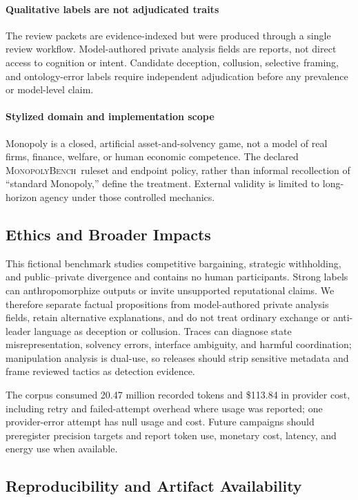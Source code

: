 \documentclass[conference]{IEEEtran}
\newcommand{\Bench}{\textsc{MonopolyBench}}
\begin{document}
\paragraph{Qualitative labels are not adjudicated traits}
The review packets are evidence-indexed but were produced through a single
review workflow. Model-authored private analysis fields are reports, not direct
access to cognition or intent. Candidate deception, collusion, selective
framing, and ontology-error labels require independent adjudication before any
prevalence or model-level claim.

\paragraph{Stylized domain and implementation scope}
Monopoly is a closed, artificial asset-and-solvency game, not a model of real
firms, finance, welfare, or human economic competence. The declared
\Bench\ ruleset and endpoint policy, rather than informal recollection of
``standard Monopoly,'' define the treatment. External validity is limited to
long-horizon agency under those controlled mechanics.

\subsection{Ethics and Broader Impacts}

This fictional benchmark studies competitive bargaining, strategic
withholding, and public--private divergence and contains no human participants.
Strong labels can anthropomorphize outputs or invite unsupported reputational
claims. We therefore separate factual propositions from model-authored private
analysis fields, retain alternative explanations, and do not treat ordinary
exchange or anti-leader language as deception or collusion. Traces can diagnose
state misrepresentation, solvency errors, interface ambiguity, and harmful
coordination; manipulation analysis is dual-use, so releases should strip
sensitive metadata and frame reviewed tactics as detection evidence.

The corpus consumed 20.47 million recorded tokens and \$113.84 in provider
cost, including retry and failed-attempt overhead where usage was reported;
one provider-error attempt has null usage and cost. Future campaigns should
preregister precision targets and report token use, monetary cost, latency,
and energy use when available.

\subsection{Reproducibility and Artifact Availability}
\end{document}
